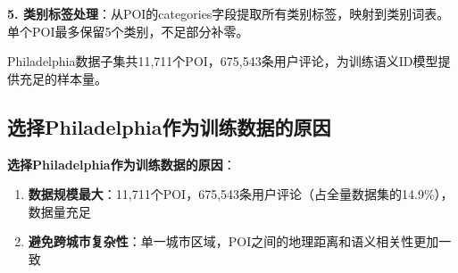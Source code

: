 \textbf{5. 类别标签处理}：从POI的categories字段提取所有类别标签，映射到类别词表。单个POI最多保留5个类别，不足部分补零。

Philadelphia数据子集共11,711个POI，675,543条用户评论，为训练语义ID模型提供充足的样本量。

\subsection{选择Philadelphia作为训练数据的原因}
\label{sec:philly_selection}

\textbf{选择Philadelphia作为训练数据的原因}：
\begin{enumerate}
    \item \textbf{数据规模最大}：11,711个POI，675,543条用户评论（占全量数据集的14.9\%），数据量充足
    \item \textbf{避免跨城市复杂性}：单一城市区域，POI之间的地理距离和语义相关性更加一致
\end{enumerate}

